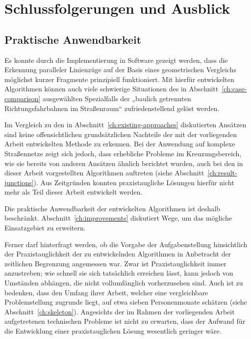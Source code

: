 \documentclass[../main/thesis.tex]{subfiles}
\begin{document}
\chapter{Schlussfolgerungen und Ausblick}
\label{ch:conclusion}

\section{Praktische Anwendbarkeit}

Es konnte durch die Implementierung in Software gezeigt werden, dass die Erkennung paralleler Linienzüge auf der Basis eines geometrischen Vergleichs möglichst kurzer Fragmente prinzipiell funktioniert.
Mit hierfür entwickelten Algorithmen können auch viele schwierige Situationen des in Abschnitt~\ref{ch:case-comparison} ausgewählten Spezialfalls der „baulich getrennten Richtungsfahrbahnen im Straßenraum“ zufriedenstellend gelöst werden.

Im Vergleich zu den in Abschnitt~\ref{ch:existing-approaches} diskutierten Ansätzen sind keine offensichtlichen grundsätzlichen Nachteile der mit der vorliegenden Arbeit entwickelten Methode zu erkennen.
Bei der Anwendung auf komplexe Straßennetze zeigt sich jedoch, dass erhebliche Probleme im Kreuzungsbereich, wie sie bereits von anderen Ansätzen ähnlich berichtet wurden, auch bei den in dieser Arbeit vorgestellten Algorithmen auftreten (siehe Abschnitt~\ref{ch:result-junctions}).
Aus Zeitgründen konnten praxistaugliche Lösungen hierfür nicht mehr als Teil dieser Arbeit entwickelt werden.

Die praktische Anwendbarkeit der entwickelten Algorithmen ist deshalb beschränkt.
Abschnitt~\ref{ch:improvements} diskutiert Wege, um das mögliche Einsatzgebiet zu erweitern.

Ferner darf hinterfragt werden, ob die Vorgabe der Aufgabenstellung hinsichtlich der Praxistauglichkeit der zu entwickelnden Algorithmen in Anbetracht der zeitlichen Begrenzung angemessen war.
Zwar ist Praxistauglichkeit immer anzustreben; wie schnell sie sich tatsächlich erreichen lässt, kann jedoch von Umständen abhängen, die nicht vollumfänglich vorherzusehen sind.
Auch ist zu bedenken, dass \citeauthor{LM96} den Umfang ihrer Arbeit, welcher eine vergleichbare Problemstellung zugrunde liegt, auf etwa sieben Personenmonate schätzen (siehe Abschnitt~\ref{ch:skeleton}). 
Angesichts der im Rahmen der vorliegenden Arbeit aufgetretenen technischen Probleme ist nicht zu erwarten, dass der Aufwand für die Entwicklung einer praxistauglichen Lösung wesentlich geringer wäre.
\end{document}
